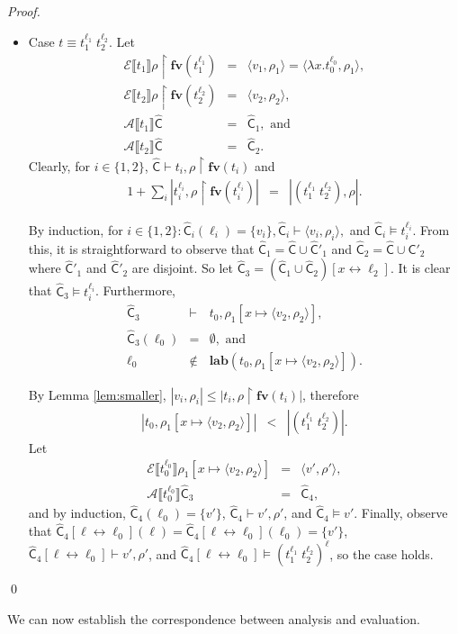 \documentclass{llncs}
\newcommand{\loves}{\ensuremath{\vdash}}
\newcommand\fv[1]{\ensuremath{\mathbf{fv}(#1)}}
\newcommand\lab[1]{\ensuremath{\mathbf{lab}(#1)}}
\newcommand\ev[1]{\ensuremath{\mathcal{E}\sem{#1}}}
\newcommand\av[1]{\ensuremath{\mathcal{A}\sem{#1}}}
\newcommand\sem[1]{\ensuremath{\llbracket #1 \rrbracket}}
\newcommand\cache{\widehat{\mathsf{C}}}
\newcommand\restrict{\ensuremath{\!\upharpoonright\!}}
\begin{document}
\begin{proof}
\begin{itemize}
\item Case $t\equiv t_1^{\ell_1}\; t_2^{\ell_2}$. Let
\begin{eqnarray*}
\ev{t_1}\rho\restrict\fv{t_1^{\ell_1}} &=& \langle v_1,\rho_1\rangle = \langle\lambda x.t_0^{\ell_0},\rho_1\rangle,\\
\ev{t_2}\rho\restrict\fv{t_2^{\ell_2}} &=& \langle v_2,\rho_2\rangle,\\
\av{t_1}\cache &=& \cache_1, \mbox{ and}\\
\av{t_2}\cache &=& \cache_2.
\end{eqnarray*}
Clearly, for $i \in \{1,2\}$, $\cache\loves t_i,\rho\restrict\fv{t_i}$ and
\begin{eqnarray*}
1+\sum_i |t_i^{\ell_i},\rho\restrict\fv{t_i^{\ell_i}}| &=& |(t_1^{\ell_1}\;t_2^{\ell_2}),\rho|.
\end{eqnarray*}

By induction, for $i\in\{1,2\} : \cache_i(\ell_i) = \{v_i\},
\cache_i\loves\langle v_i,\rho_i\rangle,$ and $\cache_i\models
t_i^{\ell_i}$.  From this, it is straightforward to observe that
$\cache_1 = \cache \cup \cache'_1$ and $\cache_2 = \cache \cup
\cache'_2$ where $\cache'_1$ and $\cache'_2$ are disjoint.  So let
$\cache_3 = (\cache_1 \cup \cache_2)[x\leftrightarrow \ell_2]$.  It is
clear that $\cache_3\models t_i^{\ell_i}$.  Furthermore,
\begin{eqnarray*}
\cache_3 &\loves& t_0,\rho_1[x\mapsto \langle v_2,\rho_2\rangle],\\
\cache_3(\ell_0) &=& \emptyset,\mbox{ and}\\
\ell_0 &\notin& \lab{t_0,\rho_1[x\mapsto \langle v_2,\rho_2\rangle]}.
\end{eqnarray*}

By Lemma \ref{lem:smaller},
$|v_i,\rho_i| \leq |t_i,\rho\restrict\fv{t_i}|$, therefore 
\begin{eqnarray*}
|t_0,\rho_1[x\mapsto \langle v_2,\rho_2\rangle]| &<& |(t_1^{\ell_1}\;t_2^{\ell_2})|.
\end{eqnarray*}
Let
\begin{eqnarray*}
\ev{t_0^{\ell_0}}\rho_1[x\mapsto \langle v_2,\rho_2\rangle] &=& \langle v',\rho'\rangle,\\
\av{t_0^{\ell_0}}\cache_3 &=& \cache_4,
\end{eqnarray*}
and by induction, $\cache_4(\ell_0) = \{v'\}$, $\cache_4\loves
v',\rho'$, and $\cache_4\models v'$.  Finally, observe that
$\cache_4[\ell\leftrightarrow\ell_0](\ell) =
\cache_4[\ell\leftrightarrow\ell_0](\ell_0) = \{v'\}$,
$\cache_4[\ell\leftrightarrow\ell_0]\loves v',\rho'$, and
$\cache_4[\ell\leftrightarrow\ell_0]\models
(t_1^{\ell_1}\;t_2^{\ell_2})^\ell$, so the case holds.
\end{itemize}
\qed
\end{proof}
We can now establish the correspondence between analysis and
evaluation.
\end{document}
